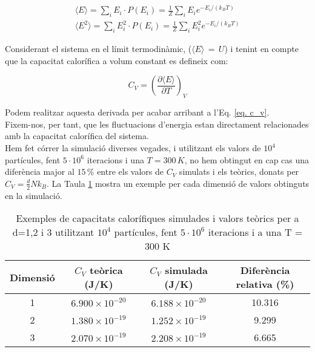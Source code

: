 \documentclass{article}
\begin{document}
	\begin{gather}
		\langle E \rangle = \sum_i E_i \cdot P(E_i)
		= \frac{1}{Z} \sum_i E_i e^{-E_i / (k_B T)}
		\\
		\langle E^2 \rangle = \sum_i E_i^2 \cdot P(E_i)
		= \frac{1}{Z} \sum_i E_i^2 e^{-E_i / (k_B T)}
	\end{gather}
	
	\noindent Considerant el sistema en el límit termodinàmic, ($\langle E \rangle  \, = \, U$) i tenint en compte que la capacitat calorífica a volum constant es defineix com:
	
	\begin{equation}
		C_V = \left( \frac{\partial \langle E \rangle}{\partial T} \right)_V
	\end{equation}
	
	\noindent Podem realitzar aquesta derivada per acabar arribant a l'Eq. \eqref{eq. c_v}.
	\\
	Fixem-nos, per tant, que les fluctuacions d'energia estan directament relacionades amb la capacitat calorífica del sistema.
	\\
	
	\noindent Hem fet córrer la simulació diverses vegades, i utilitzant els valors de $10^4$ partícules, fent $5 \cdot 10^6$ iteracions i una $T =  300 \, K$, no hem obtingut en cap cas una diferència major al $15 \, \%$ entre els valors de $C_V$ simulats i els teòrics, donats per $C_V = \frac{d}{2}Nk_B$. La Taula \ref{taula_comparacio} mostra un exemple per cada dimensió de valors obtinguts en la simulació.
	
	\begin{table}[h!]
		\centering
		\begin{tabular}{|c|c|c|c|}
			\hline
			\textbf{Dimensió} & \textbf{$C_V$ teòrica (J/K)} & \textbf{$C_V$ simulada (J/K)} & \textbf{Diferència relativa (\%)} \\ \hline
			1 & $6.900 \times 10^{-20}$ & $6.188 \times 10^{-20}$ & 10.316 \\ \hline
			2 & $1.380 \times 10^{-19}$ & $1.252 \times 10^{-19}$ & 9.299 \\ \hline
			3 & $2.070 \times 10^{-19}$ & $2.208 \times 10^{-19}$ & 6.665 \\ \hline
		\end{tabular}
		\caption{Exemples de capacitats calorífiques simulades i valors teòrics per a d=1,2 i 3 utilitzant $10^4$ partícules, fent $5 \cdot 10^6$ iteracions i a una T = 300 K}
		\label{taula_comparacio}
	\end{table}
	
\end{document}
